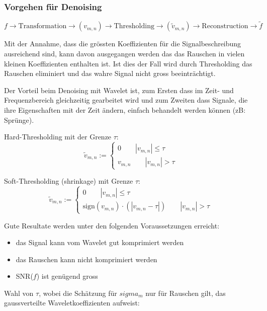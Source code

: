 \subsubsection{Vorgehen für Denoising}
\[ 
	f \longrightarrow \boxed{\mathrm{Transformation}} \longrightarrow (v_{m,n}) \longrightarrow \boxed{\mathrm{Thresholding}} \longrightarrow (\tilde{v}_{m,n}) \longrightarrow \boxed{\mathrm{Reconstruction}}\longrightarrow \tilde{f} 
\]

Mit der Annahme, dass die grössten Koeffizienten für die Signalbeschreibung ausreichend sind, kann davon ausgegangen werden das das Rauschen in vielen kleinen Koeffizienten enthalten ist. Ist dies der Fall wird durch Thresholding das Rauschen eliminiert und das wahre Signal nicht gross beeinträchtigt.

Der Vorteil beim Denoising mit Wavelet ist, zum Ersten dass im Zeit- und Frequenzbereich gleichzeitig gearbeitet wird und zum Zweiten dass Signale, die ihre Eigenschaften mit der Zeit ändern, einfach behandelt werden können (zB: Sprünge). 

\vspace{0.5cm}

\begin{minipage}[c]{0.5\textwidth}
	Hard-Thresholding mit der Grenze $\tau$:
	\[ \tilde{v}_{m,n} := \begin{cases} 0 \qquad |v_{m,n}| \leq \tau \\ v_{m,n} \qquad |v_{m,n}| > \tau \end{cases} \]
\end{minipage}
\begin{minipage}[c]{0.5\textwidth}
	Soft-Thresholding (shrinkage) mit Grenze $\tau$:
	\[ \tilde{v}_{m,n} := \begin{cases} 0 \qquad |v_{m,n}| \leq \tau \\ \mathrm{sign}(v_{m,n}) \cdot (|v_{m,n}-\tau|) \qquad |v_{m,n}| > \tau \end{cases} \]
\end{minipage}

Gute Resultate werden unter den folgenden Voraussetzungen erreicht:
\begin{itemize}
	\item das Signal kann vom Wavelet gut komprimiert werden
	\item das Rauschen kann nicht komprimiert werden
	\item SNR($f$) ist genügend gross
\end{itemize}


Wahl von $\tau$, wobei die Schätzung für $sigma_m$ nur für Rauschen gilt, das gaussverteilte Waveletkoeffizienten aufweist:

